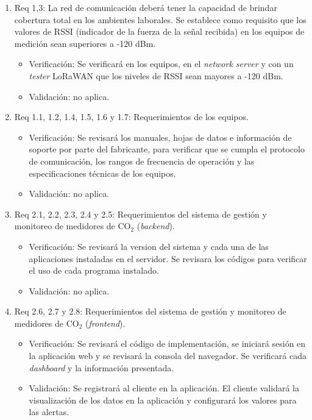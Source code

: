 \documentclass[
11pt, %
]{charter}
\begin{document}
\begin{enumerate}
	\item Req 1,3: La red de comunicación deberá tener la capacidad de brindar cobertura total en los ambientes laborales. Se establece como requisito que los valores de RSSI (indicador de la fuerza de la señal recibida) en los equipos de medición sean superiores a -120 dBm.
	\begin{itemize}
		\item Verificación: Se verificará en los equipos, en el \textit{network server} y con un \textit{tester} LoRaWAN que los niveles de RSSI sean mayores a -120 dBm.
		\item Validación: no aplica.
	\end{itemize}
	\item Req 1.1, 1.2, 1.4, 1.5, 1.6 y 1.7: Requerimientos de los equipos.
	\begin{itemize}
		\item Verificación: Se revisará los manuales, hojas de datos e información de soporte por parte del fabricante, para verificar que se cumpla el protocolo de comunicación, los rangos de frecuencia de operación y las especificaciones técnicas de los equipos.
		\item Validación: no aplica.
	\end{itemize}
	\item Req 2.1, 2.2, 2.3, 2.4 y 2.5: Requerimientos del sistema de gestión y monitoreo de medidores de CO${_2}$ (\textit{backend}).
	\begin{itemize}
		\item Verificación: Se revisará la version del sistema y cada una de las aplicaciones instaladas en el servidor. Se revisara los códigos para verificar el uso de cada programa instalado.
		\item Validación: no aplica.
	\end{itemize}
	\item Req 2.6, 2.7 y 2.8: Requerimientos del sistema de gestión y monitoreo de medidores de CO${_2}$ (\textit{frontend}).
	\begin{itemize}
		\item Verificación: Se revisará el código de implementación, se iniciará sesión en la aplicación web y se revisará la consola del navegador. Se verificará cada \textit{dashboard} y la información presentada.
		\item Validación: Se registrará al cliente en la aplicación. El cliente validará la visualización de los datos en la aplicación y configurará los valores para las alertas.

\end{itemize}
\end{enumerate}
\end{document}
